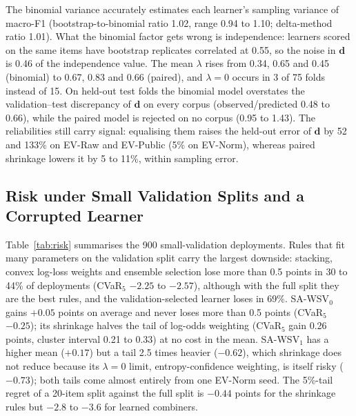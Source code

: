\documentclass[conference,a4paper]{IEEEtran}
\newcommand{\rcz}{SA\mbox{-}WSV$_0$}
\newcommand{\rco}{SA\mbox{-}WSV$_1$}
\begin{document}
The binomial variance accurately estimates each learner's sampling variance of macro-F1 (bootstrap-to-binomial ratio 1.02, range 0.94 to 1.10; delta-method ratio 1.01). What the binomial factor gets wrong is independence: learners scored on the same items have bootstrap replicates correlated at 0.55, so the noise in $\mathbf d$ is 0.46 of the independence value. The mean $\lambda$ rises from 0.34, 0.65 and 0.45 (binomial) to 0.67, 0.83 and 0.66 (paired), and $\lambda=0$ occurs in 3 of 75 folds instead of 15. On held-out test folds the binomial model overstates the validation--test discrepancy of $\mathbf d$ on every corpus (observed/predicted 0.48 to 0.66), while the paired model is rejected on no corpus (0.95 to 1.43). The reliabilities still carry signal: equalising them raises the held-out error of $\mathbf d$ by 52 and 133\% on EV-Raw and EV-Public (5\% on EV-Norm), whereas paired shrinkage lowers it by 5 to 11\%, within sampling error.

\subsection{Risk under Small Validation Splits and a Corrupted Learner}
Table~\ref{tab:risk} summarises the 900 small-validation deployments. Rules that fit many parameters on the validation split carry the largest downside: stacking, convex log-loss weights and ensemble selection lose more than 0.5 points in 30 to 44\% of deployments (CVaR$_5$ $-2.25$ to $-2.57$), although with the full split they are the best rules, and the validation-selected learner loses in 69\%. \rcz{} gains $+0.05$ points on average and never loses more than 0.5 points (CVaR$_5$ $-0.25$); its shrinkage halves the tail of log-odds weighting (CVaR$_5$ gain 0.26 points, cluster interval 0.21 to 0.33) at no cost in the mean. \rco{} has a higher mean ($+0.17$) but a tail 2.5 times heavier ($-0.62$), which shrinkage does not reduce because its $\lambda=0$ limit, entropy-confidence weighting, is itself risky ($-0.73$); both tails come almost entirely from one EV-Norm seed. The 5\%-tail regret of a 20-item split against the full split is $-0.44$ points for the shrinkage rules but $-2.8$ to $-3.6$ for learned combiners.
\end{document}
